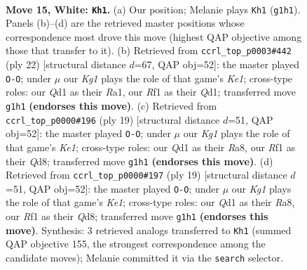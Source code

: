 \documentclass[11pt]{article}
\begin{document}
\clearpage

\begin{figure}[p]\centering
\begin{subfigure}{0.46\textwidth}\centering
\resizebox{\linewidth}{!}{%
\newchessgame
\chessboard[
  setfen={r1bnrk2/1pppqppp/p4n2/3P4/8/2B1PNP1/PP3PBP/R2Q1RK1 w - - 5 15},
  showmover=false,
  pgfstyle=straightmove, color=movearrow, markmove={g1-h1}
]}
\caption{}
\end{subfigure}\hfill
\begin{subfigure}{0.46\textwidth}\centering
\resizebox{\linewidth}{!}{%
\newchessgame
\chessboard[
  setfen={rn3rk1/pp2qppp/3p1n2/3P1b2/4p3/P1B3PN/1P2PPBP/R2QK2R w KQ - 2 12},
  showmover=false,
  pgfstyle=straightmove, color=movearrow, markmove={e1-g1}
]}
\caption{}
\end{subfigure}
\\[4pt]
\begin{subfigure}{0.46\textwidth}\centering
\resizebox{\linewidth}{!}{%
\newchessgame
\chessboard[
  setfen={r2qk2r/pbpnbp1p/1p2pp2/8/2BPN3/5N2/PPP1QPPP/R4RK1 b kq - 5 10},
  showmover=false,
  pgfstyle=straightmove, color=movearrow, markmove={e8-g8}
]}
\caption{}
\end{subfigure}\hfill
\begin{subfigure}{0.46\textwidth}\centering
\resizebox{\linewidth}{!}{%
\newchessgame
\chessboard[
  setfen={r2qk2r/pbpnbp1p/1p2pp2/8/2BPN3/5N2/PPP1QPPP/R4RK1 b kq - 5 10},
  showmover=false,
  pgfstyle=straightmove, color=movearrow, markmove={e8-g8}
]}
\caption{}
\end{subfigure}
\caption{\textbf{Move 15, White: \texttt{Kh1}.} (a) Our position; Melanie plays \texttt{Kh1} (\texttt{g1h1}). Panels (b)--(d) are the retrieved master positions whose correspondence most drove this move (highest QAP objective among those that transfer to it). (b) Retrieved from \texttt{ccrl\_top\_p0003\#442} (ply 22) [structural distance $d$=67, QAP obj=52]: the master played \texttt{O-O}; under $\mu$ our \emph{Kg1} plays the role of that game's \emph{Ke1}; cross-type roles: our \emph{Q}d1 as their \emph{R}a1, our \emph{R}f1 as their \emph{Q}d1; transferred move \texttt{g1h1} \textbf{(endorses this move)}. (c) Retrieved from \texttt{ccrl\_top\_p0000\#196} (ply 19) [structural distance $d$=51, QAP obj=52]: the master played \texttt{O-O}; under $\mu$ our \emph{Kg1} plays the role of that game's \emph{Ke1}; cross-type roles: our \emph{Q}d1 as their \emph{R}a8, our \emph{R}f1 as their \emph{Q}d8; transferred move \texttt{g1h1} \textbf{(endorses this move)}. (d) Retrieved from \texttt{ccrl\_top\_p0000\#197} (ply 19) [structural distance $d$=51, QAP obj=52]: the master played \texttt{O-O}; under $\mu$ our \emph{Kg1} plays the role of that game's \emph{Ke1}; cross-type roles: our \emph{Q}d1 as their \emph{R}a8, our \emph{R}f1 as their \emph{Q}d8; transferred move \texttt{g1h1} \textbf{(endorses this move)}. Synthesis: 3 retrieved analogs transferred to \texttt{Kh1} (summed QAP objective 155, the strongest correspondence among the candidate moves); Melanie committed it via the \texttt{search} selector.}
\label{fig:thought-m28}
\end{figure}
\end{document}
